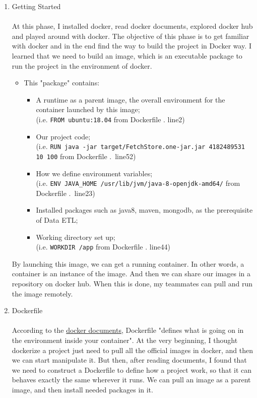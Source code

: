 \documentclass{article}
\newcommand{\codeinline}[1]{
	\texttt{#1}
}
\begin{document}
\begin{enumerate}
    \item Getting Started\\\\
    At this phase, I installed docker, read docker documents, explored docker hub and played around with docker. The objective of this phase is to get familiar with docker and in the end find the way to build the project in Docker way. I learned that we need to build an image, which is an executable package to run the project in the environment of docker. 
    \begin{itemize}
        \item This "package" contains:
        \begin{itemize}
            \item A runtime as a parent image, the overall environment for the container launched by this image;\\(i.e.\codeinline{FROM ubuntu:18.04} from Dockerfile . line2)
            \item Our project code;\\ (i.e.\codeinline{RUN java -jar target/FetchStore.one-jar.jar 4182489531 10 100} from Dockerfile .\ line52)
            \item How we define environment variables;\\ (i.e. \codeinline{ENV JAVA_HOME /usr/lib/jvm/java-8-openjdk-amd64/} from Dockerfile .\ line23)
            \item Installed packages such as java8, maven, mongodb, as the prerequisite of Data ETL;
            \item Working directory set up;\\(i.e.\codeinline{WORKDIR /app} from Dockerfile . line44)
        \end{itemize}
    \end{itemize}
    
    By launching this image, we can get a running container. In other words, a container is an instance of the image. And then we can share our images in a repository on docker hub. When this is done, my teammates can pull and run the image remotely.\\
    
    \item Dockerfile\\\\
    According to the \href{https://docs.docker.com/}{docker documents}, Dockerfile "defines what is going on in the environment inside your container". At the very beginning, I thought dockerize a project just need to pull all the official images in docker, and then we can start manipulate it. But then, after reading documents, I found that we need to construct a Dockerfile to define how a project work, so that it can behaves exactly the same wherever it runs. We can pull an image as a parent image, and then install needed packages in it. \\
    

\end{enumerate}
\end{document}
